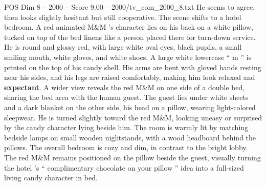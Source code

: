 \begin{textsample}{POS Dim 8 – 2000 – Score 9.00 – 2000/tv\_com\_2000\_8.txt}
He seems to agree, then looks slightly hesitant but still cooperative.
The scene shifts to a hotel bedroom.
A red animated M\&M ’s character lies on his back on a white pillow, tucked on top of the bed linens like a person placed there for turn-down service.
He is round and glossy red, with large white oval eyes, black pupils, a small smiling mouth, white gloves, and white shoes.
A large white lowercase “ m ” is printed on the top of his candy shell.
His arms are bent with gloved hands resting near his sides, and his legs are raised comfortably, making him look relaxed and \textbf{expectant}.
A wider view reveals the red M\&M on one side of a double bed, sharing the bed area with the human guest.
The guest lies under white sheets and a dark blanket on the other side, his head on a pillow, wearing light-colored sleepwear.
He is turned slightly toward the red M\&M, looking uneasy or surprised by the candy character lying beside him.
The room is warmly lit by matching bedside lamps on small wooden nightstands, with a wood headboard behind the pillows.
The overall bedroom is cozy and dim, in contrast to the bright lobby.
The red M\&M remains positioned on the pillow beside the guest, visually turning the hotel ’s “ complimentary chocolate on your pillow ” idea into a full-sized living candy character in bed.

\end{textsample}
